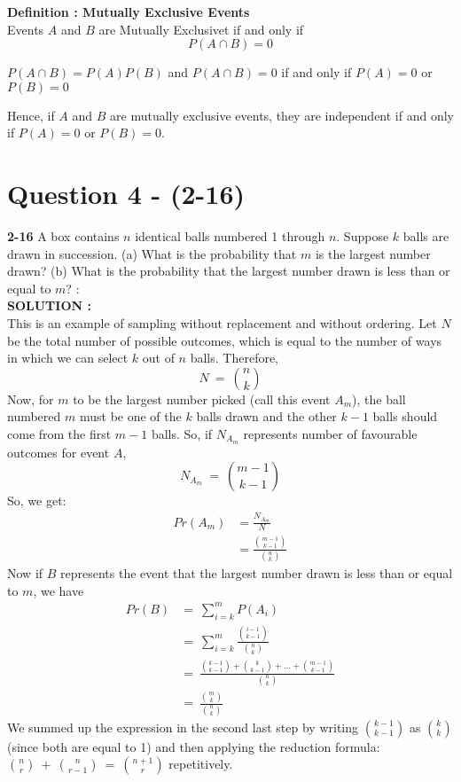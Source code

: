 \documentclass{article}
\begin{document}
\textbf{Definition : Mutually Exclusive Events} \\
Events $A$ and $B$ are Mutually Exclusivet if and only if \\
$$P(A \cap B) = 0  $$

$P(A \cap B) = P(A) P(B)  $ and $P(A \cap B) = 0  $ if and only if $P(A) = 0$ or $P(B) = 0$

Hence, if $A$ and $B$ are mutually exclusive events, they are independent if and only if $P(A) = 0$ or $P(B) = 0$.
\section{Question 4 - (2-16)}
\label{Q4}
\textbf{2-16}  A box contains $n$ identical balls numbered 1 through $n$. Suppose $k$ balls are drawn in succession. (a) What is the probability that $m$ is the largest number drawn? (b) What is the probability that the largest number drawn is less than or equal to $m$?  : \\

\hspace{1em} \large{\textbf{SOLUTION :}} \\
This is an example of sampling without replacement and without ordering. Let $N$ be the total number of possible outcomes, which is equal to the number of ways in which we can select $k$ out of $n$ balls. Therefore,
\begin{equation*}
    N\ = \ {n \choose k }
\end{equation*}
Now, for $m$ to be the largest number picked (call this event $A_m$), the ball numbered $m$ must be one of the $k$ balls drawn and the other $k-1$ balls should come from the first $m-1$ balls. So, if $N_{A_m}$ represents number of favourable outcomes for event $A$,
\begin{equation*}
    N_{A_m}\ =\ {m-1 \choose k-1}
\end{equation*}
So, we get:
\begin{equation*}
\begin{split}
Pr(A_m) & = \frac{N_{A_m}}{N} \\
 & = \frac{{m-1 \choose k-1}}{{n \choose k }} 
\end{split}
\end{equation*}
Now if $B$ represents the event that the largest number drawn is less than or equal to $m$, we have
\begin{equation*}
\begin{split}
    Pr(B) & =\ \sum_{i=k}^{m} P(A_i) \\
            &=\ \sum_{i=k}^{m} \frac{{i-1 \choose k-1}}{{n \choose k}} \\
            &=\ \frac{{k-1 \choose k-1} + {k \choose k-1} + \dots + {m-1 \choose k-1}}{{n \choose k}} \\
            &=\ \frac{{m \choose k }}{{n \choose k}}
\end{split}
\end{equation*}
We summed up the expression in the second last step by writing ${k-1 \choose k-1}$ as ${k \choose k}$ (since both are equal to 1) and then applying the reduction formula: ${n \choose r}\ +\ {n \choose r-1}\ =\ {n+1 \choose r}$ repetitively.
\end{document}
